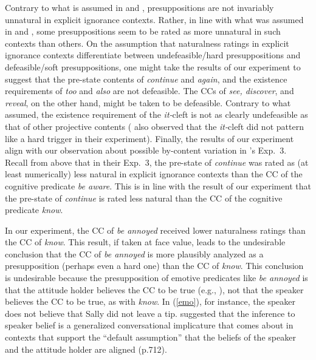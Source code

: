 \documentclass[11pt,fleqn]{article}
\newcommand{\6}{\mbox{$[\hspace*{-.6mm}[$}}
\newcommand{\9}{\mbox{$]\hspace*{-.6mm}]$}}
\newcommand{\citepos}[1]{\citeauthor{#1}'s \citeyear{#1}}
\begin{document}
Contrary to what is assumed in \citealt{mandelkern-etal2020} and \citealt{kalomoiros-schwarz2021,kalomoiros-schwarz-JoS}, presuppositions are not invariably unnatural in explicit ignorance contexts. Rather, in line with what was assumed in \citealt{simons01} and \citealt{abusch10}, some presuppositions seem to be rated as more unnatural in such contexts than others. On the assumption that naturalness ratings in explicit ignorance contexts differentiate between undefeasible/hard presuppositions and defeasible/soft presuppositions, one might take the results of our experiment to suggest that the pre-state contents of {\em continue} and {\em again}, and the existence requirements of {\em too} and {\em also} are not defeasible. The CCs of {\em see, discover}, and {\em reveal}, on the other hand, might be taken to be defeasible. Contrary to what \citealt{abusch10} assumed, the existence requirement of the {\em it-}cleft is not as clearly undefeasible as that of other projective contents (\citealt{smith-hall11} also observed that the {\em it-}cleft did not pattern like a hard trigger in their experiment). Finally, the results of our experiment align with our observation about possible by-content variation in \citepos{mandelkern-etal2020} Exp.~3. Recall from above that in their Exp.~3, the pre-state of {\em continue} was rated as (at least numerically) less natural in explicit ignorance contexts than the CC of the cognitive predicate {\em be aware}. This is in line with the result of our experiment that the pre-state of {\em continue} is rated less natural than the CC of the cognitive predicate {\em know}.

In our experiment, the CC of {\em be annoyed} received lower naturalness ratings than the CC of {\em know}. This result, if taken at face value, leads to the undesirable conclusion that the CC of {\em be annoyed} is more plausibly analyzed as a presupposition (perhaps even a hard one) than the CC of {\em know}. This conclusion is undesirable because the presupposition of emotive predicates like {\em be annoyed} is that the attitude holder believes the CC to be true (e.g., \citealt{heim92,karttunen2016}), not that the speaker believes the CC to be true, as with {\em know}. In (\ref{emo}), for instance, the speaker does not believe that Sally did not leave a tip. \citealt{karttunen2016} suggested that the inference to speaker belief is a generalized conversational implicature that comes about in contexts that support the ``default assumption'' that the beliefs of the speaker and the attitude holder are aligned (p.712).
\end{document}
